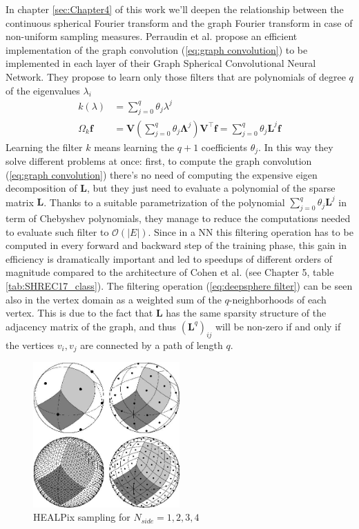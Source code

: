 In chapter \ref{sec:Chapter4} of this work we'll deepen the relationship between the continuous spherical Fourier transform and the graph Fourier transform in case of non-uniform sampling measures. Perraudin et al. propose an efficient implementation of the graph convolution (\ref{eq:graph convolution}) to be implemented in each layer of their Graph Spherical Convolutional Neural Network. They propose to learn only those filters that are polynomials of degree $q$ of the eigenvalues $\lambda_i$
\begin{equation}\label{eq:deepsphere filter}
\begin{aligned}
k(\lambda) &= \sum_{j=0}^{q} \theta_{j} \lambda^{j}\\ 
\Omega_k \mathbf f &= \mathbf{V}\left(\sum_{j=0}^{q} \theta_{j} \mathbf{\Lambda}^{j}\right) \mathbf{V}^{\top} \mathbf{f}=\sum_{j=0}^{q} \theta_{j} \mathbf{L}^{j} \mathbf{f}
\end{aligned}
\end{equation}
Learning the filter $k$ means learning the $q+1$ coefficients $\theta_j$. In this way they solve different problems at once: first, to compute the graph convolution (\ref{eq:graph convolution}) there's no need of computing the expensive eigen decomposition of $\mathbf L$, but they just need to evaluate a polynomial of the sparse matrix $\mathbf L$. Thanks to a suitable parametrization of the polynomial $\sum_{j=0}^{q} \theta_{j} \mathbf{L}^{j}$ in term of Chebyshev polynomials, they manage to reduce the computations needed to evaluate such filter to $\mathcal O(|E|)$. Since in a NN this filtering operation has to be computed in every forward and backward step of the training phase, this gain in efficiency is dramatically important and led to speedups of different orders of magnitude compared to the architecture of Cohen et al. (see Chapter 5, table \ref{tab:SHREC17_class}). The filtering operation (\ref{eq:deepsphere filter}) can be seen also in the vertex domain as a weighted sum of the $q$-neighborhoods of each vertex. This is due to the fact that $\mathbf L $ has the same sparsity structure of the adjacency matrix of the graph, and thus $(\mathbf L^q)_{ij}$ will be non-zero if and only if the vertices $v_i, v_j$ are connected by a path of length $q$. 

\begin{figure}
	\centering
	\includegraphics[width=0.5\textwidth]{figs/chapter1/healpix.jpg}
	\caption{\label{fig:healpix sampling}HEALPix sampling for $N_{side}=1,2,3,4$ \cite{HEALPix}}
\end{figure}

